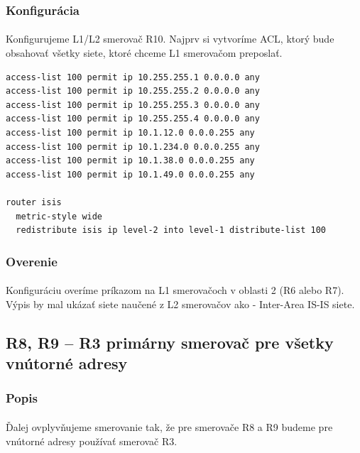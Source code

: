 \documentclass[12pt,twoside,a4paper]{report}
\begin{document}
\subsubsection{Konfigurácia}
\paragraph{}
Konfigurujeme L1/L2 smerovač R10. Najprv si vytvoríme ACL, ktorý bude obsahovať všetky siete, ktoré chceme L1 smerovačom preposlať.

\noindent
{\selectfont
\begin{small}
\begin{verbatim}
access-list 100 permit ip 10.255.255.1 0.0.0.0 any
access-list 100 permit ip 10.255.255.2 0.0.0.0 any
access-list 100 permit ip 10.255.255.3 0.0.0.0 any
access-list 100 permit ip 10.255.255.4 0.0.0.0 any
access-list 100 permit ip 10.1.12.0 0.0.0.255 any
access-list 100 permit ip 10.1.234.0 0.0.0.255 any
access-list 100 permit ip 10.1.38.0 0.0.0.255 any
access-list 100 permit ip 10.1.49.0 0.0.0.255 any

router isis
  metric-style wide
  redistribute isis ip level-2 into level-1 distribute-list 100
\end{verbatim}
\end{small}
}

\subsubsection{Overenie}
\paragraph{}
Konfiguráciu overíme príkazom  na L1 smerovačoch v oblasti 2 (R6 alebo R7). Výpis by mal ukázať siete naučené z L2 smerovačov ako  - Inter-Area IS-IS siete.





\subsection{R8, R9 – R3 primárny smerovač pre všetky vnútorné adresy}
\label{R8_primarny_smerovac}
\subsubsection{Popis}
\paragraph{}
Ďalej ovplyvňujeme smerovanie tak, že pre smerovače R8 a R9 budeme pre vnútorné adresy používať smerovač R3.
\end{document}
